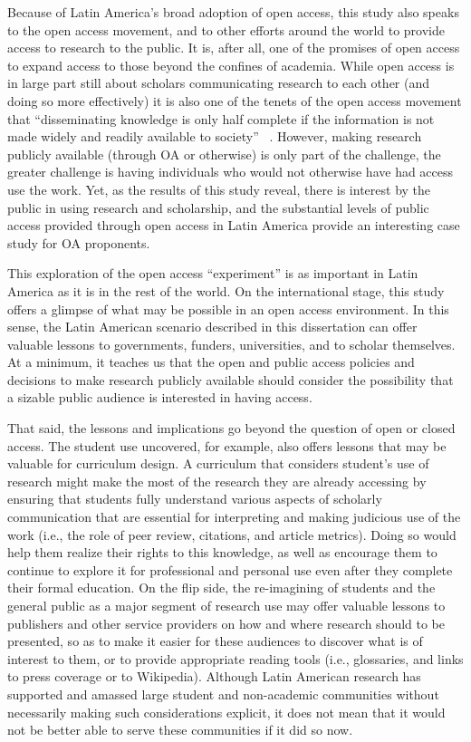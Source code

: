 Because of Latin America's broad adoption of open access, this study also speaks to the open access movement, and to other efforts around the world to provide access to research to the public. It is, after all, one of the promises of open access to expand access to those beyond the confines of academia. While open access is in large part still about scholars communicating research to each other (and doing so more effectively) it is also one of the tenets of the open access movement that ``disseminating knowledge is only half complete if the information is not made widely and readily available to society'' ~\citep[n.p.]{MaxPlanck2003}. However, making research publicly available (through OA or otherwise) is only part of the challenge, the greater challenge is having individuals who would not otherwise have had access use the work. Yet, as the results of this study reveal, there is interest by the public in using research and scholarship, and the substantial levels of public access provided through open access in Latin America provide an interesting case study for OA proponents.

This exploration of the open access ``experiment'' is as important in Latin America as it is in the rest of the world. On the international stage, this study offers a glimpse of what may be possible in an open access environment. In this sense, the Latin American scenario described in this dissertation can offer valuable lessons to governments, funders, universities, and to scholar themselves. At a minimum, it teaches us that the open and public access policies and decisions to make research publicly available should consider the possibility that a sizable public audience is interested in having access.

That said, the lessons and implications go beyond the question of open or closed access. The student use uncovered, for example, also offers lessons that may be valuable for curriculum design. A curriculum that considers student's use of research might make the most of the research they are already accessing by ensuring that students fully understand various aspects of scholarly communication that are essential for interpreting and making judicious use of the work (i.e., the role of peer review, citations, and article metrics). Doing so would help them realize their rights to this knowledge, as well as encourage them to continue to explore it for professional and personal use even after they complete their formal education. On the flip side, the re-imagining of students and the general public as a major segment of research use may offer valuable lessons to publishers and other service providers on how and where research should to be presented, so as to make it easier for these audiences to discover what is of interest to them, or to provide appropriate reading tools (i.e., glossaries, and links to press coverage or to Wikipedia). Although Latin American research has supported and amassed large student and non-academic communities without necessarily making such considerations explicit, it does not mean that it would not be better able to serve these communities if it did so now.

